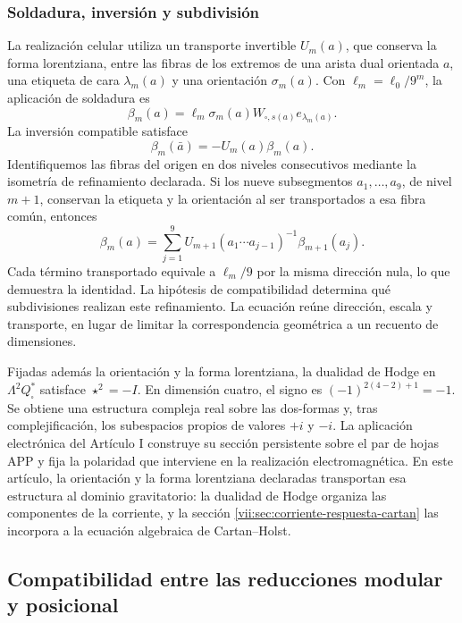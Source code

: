 \subsubsection{Soldadura, inversión y subdivisión}

La realización celular utiliza un transporte invertible \(U_m(a)\),
que conserva la forma lorentziana, entre las fibras de los extremos de
una arista dual orientada \(a\), una etiqueta
de cara \(\lambda_m(a)\) y una orientación \(\sigma_m(a)\).
Con \(\ell_m=\ell_0/9^m\), la aplicación de soldadura es
\[
 \beta_m(a)=\ell_m\sigma_m(a)
 W_{\square,s(a)}e_{\lambda_m(a)}.
\]
La inversión compatible satisface
\[
 \beta_m(\bar a)=-U_m(a)\beta_m(a).
\]
Identifiquemos las fibras del origen en dos niveles consecutivos mediante
la isometría de refinamiento declarada. Si los nueve subsegmentos
\(a_1,\ldots,a_9\), de nivel \(m+1\), conservan la etiqueta
y la orientación al ser transportados a esa fibra común, entonces
\begin{equation}
 \beta_m(a)=\sum_{j=1}^9
 U_{m+1}(a_1\cdots a_{j-1})^{-1}\beta_{m+1}(a_j).
 \label{eq:soldadura-refinamiento}
\end{equation}
Cada término transportado equivale a \(\ell_m/9\) por la misma
dirección nula, lo que demuestra la identidad. La hipótesis de
compatibilidad determina qué subdivisiones realizan este refinamiento.
La ecuación reúne dirección, escala y transporte, en lugar de limitar
la correspondencia geométrica a un recuento de dimensiones.

Fijadas además la orientación y la forma lorentziana, la dualidad de
Hodge en \(\Lambda^2Q_\square^*\) satisface \(\star^2=-I\).
En dimensión cuatro, el signo es \((-1)^{2(4-2)+1}=-1\).
Se obtiene una estructura compleja real sobre las dos-formas y,
tras complejificación, los subespacios propios de valores \(+i\) y
\(-i\). La aplicación electrónica del Artículo I construye su sección
persistente sobre el par de hojas APP y fija la polaridad que interviene en
la realización electromagnética. En este artículo, la orientación y la forma
lorentziana declaradas transportan esa estructura al dominio gravitatorio:
la dualidad de Hodge organiza las componentes de la corriente, y la sección
\ref{vii:sec:corriente-respuesta-cartan} las incorpora a la ecuación
algebraica de Cartan--Holst.

\subsection{Compatibilidad entre las reducciones modular y posicional}

